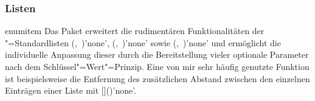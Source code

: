 \subsubsection{Listen}
%
%
\begin{packages}
\item[enumitem]
  Das Paket  erweitert die rudimentären Funktionalitäten der 
  "=Standardlisten
  (,~)'none',
  (,~)'none' sowie
  (,~)'none' und
  ermöglicht die individuelle Anpassung dieser durch die Bereitstellung vieler 
  optionale Parameter nach dem Schlüssel"=Wert"=Prinzip. Eine von mir sehr 
  häufig genutzte Funktion ist beispielsweise die Entfernung des zusätzlichen 
  Abstand zwischen den einzelnen Einträgen einer Liste mit 
  []()'none'.
%
\end{packages}


